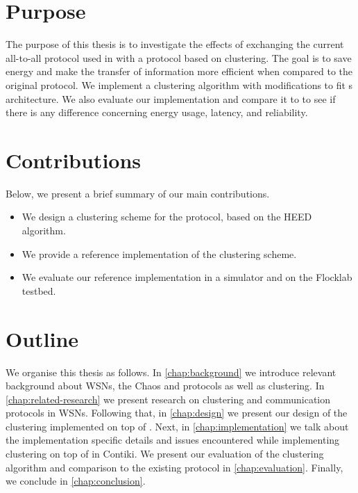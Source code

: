  \section{Purpose}
The purpose of this thesis is to investigate the effects of exchanging the current all-to-all protocol used in \atwo{} with a protocol based on clustering. The goal is to save energy and make the transfer of information more efficient when compared to the original \atwo{} protocol. We implement a clustering algorithm with modifications to fit \atwo{}s architecture. We also evaluate our implementation and compare it to \atwo{} to see if there is any difference concerning energy usage, latency, and reliability.

\section{Contributions}
Below, we present a brief summary of our main contributions.

\begin{itemize}
    \item We design a clustering scheme for the \atwo{} protocol, based on the HEED algorithm.
    \item We provide a reference implementation of the clustering scheme.
    \item We evaluate our reference implementation in a simulator and on the Flocklab testbed.
\end{itemize}

\section{Outline}
We organise this thesis as follows. In \cref{chap:background} we introduce relevant background about WSNs, the Chaos and \atwo{} protocols as well as clustering. In \cref{chap:related-research} we present research on clustering and communication protocols in WSNs. Following that, in \cref{chap:design} we present our design of the clustering implemented on top of \atwo{}. Next, in \cref{chap:implementation} we talk about the implementation specific details and issues encountered while implementing clustering on top of \atwo{} in Contiki. We present our evaluation of the clustering algorithm and comparison to the existing \atwo{} protocol in \cref{chap:evaluation}. Finally, we conclude in \cref{chap:conclusion}.
